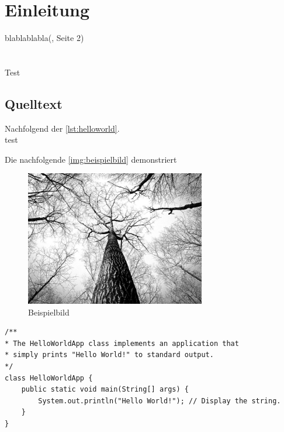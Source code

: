 \chapter{Einleitung}
blablablabla(\cite{Adler}, Seite 2)\\\\\\
Test\cite{Adler.2013}
\section{Quelltext}

Nachfolgend der \autoref{lst:helloworld}.\\
test\cite{Adler}

Die nachfolgende \autoref{img:beispielbild} demonstriert

\begin{figure}[H]
	\centering
	\includegraphics[width=0.7\textwidth]{resources/example}
	\caption{Beispielbild {\cite{PEXELS2015}}}
	\label{img:beispielbild}
\end{figure}

\begin{lstlisting}[caption={Hello World}, captionpos=b, label={lst:helloworld}]
/**
* The HelloWorldApp class implements an application that
* simply prints "Hello World!" to standard output.
*/
class HelloWorldApp {
	public static void main(String[] args) {
		System.out.println("Hello World!"); // Display the string.
	}
}
\end{lstlisting}
\blindtext

